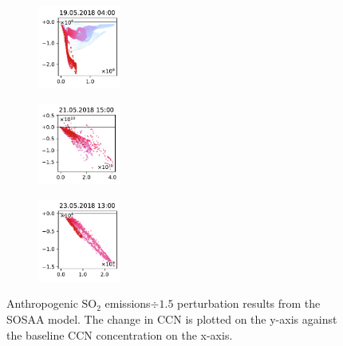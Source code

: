 \begin{figure}[H]
    \begin{subfigure}
        \centering
        \includegraphics[width=0.30\textwidth,valign=t]{evaluation/figures/perturbations/perturbation-19.05.2018:04.00-so2-div-1.5.pdf}
    \end{subfigure}
    \begin{subfigure}
        \centering
        \includegraphics[width=0.30\textwidth,valign=t]{evaluation/figures/perturbations/perturbation-21.05.2018:15.00-so2-div-1.5.pdf}
    \end{subfigure}
    \begin{subfigure}
        \centering
        \includegraphics[width=0.30\textwidth,valign=t]{evaluation/figures/perturbations/perturbation-23.05.2018:13.00-so2-div-1.5.pdf}
    \end{subfigure}

    \caption[$\text{SO}_2$ emissions$\div 1.5$ perturbation SOSAA results]{Anthropogenic $\text{SO}_2$ emissions$\div 1.5$ perturbation results from the SOSAA model. The change in CCN is plotted on the y-axis against the baseline CCN concentration on the x-axis.}
    \label{fig:sosaa-perturbation-so2-div-1.5}
\end{figure}

